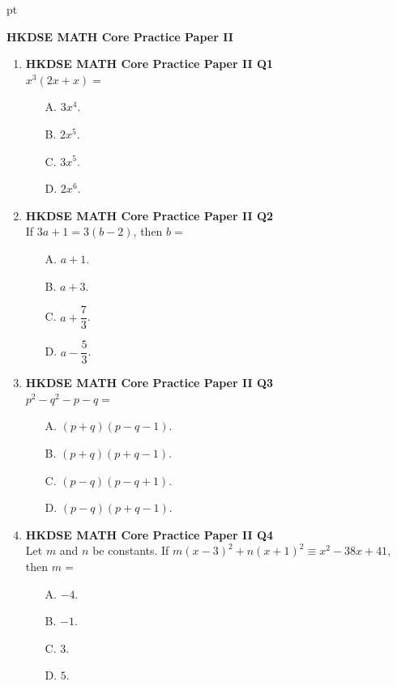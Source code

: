 \documentclass[12pt]{article}
\begin{document}
 pt
\begin{center}
	{\large \bf HKDSE MATH Core Practice Paper II}\\
	\vspace{2 mm}
\end{center}
\vspace{0.05cm}

\begin{enumerate}
	\item \textbf{HKDSE MATH Core Practice Paper II Q1}\\
	$x^3(2x + x) = $
	\begin{enumerate}
		\item[A.] $3x^4$.
		\item[B.] $2x^5$.
		\item[C.] $3x^5$.
		\item[D.] $2x^6$.
	\end{enumerate}

	\item \textbf{HKDSE MATH Core Practice Paper II Q2}\\
	If $3a + 1 = 3(b - 2)$, then $b =$
	\begin{enumerate}
		\item[A.] $a + 1$.
		\item[B.] $a + 3$.
		\item[C.] $a + \dfrac{7}{3}$.
		\item[D.] $a - \dfrac{5}{3}$.
	\end{enumerate}

	\item \textbf{HKDSE MATH Core Practice Paper II Q3}\\
	$p^2 - q^2 - p - q =$
	\begin{enumerate}
		\item[A.] $(p + q)(p - q - 1)$.
		\item[B.] $(p + q)(p + q - 1)$.
		\item[C.] $(p - q)(p - q + 1)$.
		\item[D.] $(p - q)(p + q - 1)$.
	\end{enumerate}

	\item \textbf{HKDSE MATH Core Practice Paper II Q4}\\
	Let $m$ and $n$ be constants. If $m(x - 3)^2 + n(x + 1)^2 \equiv x^2 - 38x + 41$, then $m = $
	\begin{enumerate}
		\item[A.] $-4$.
		\item[B.] $-1$.
		\item[C.] $3$.
		\item[D.] $5$.
	\end{enumerate}


\end{enumerate}
\end{document}
